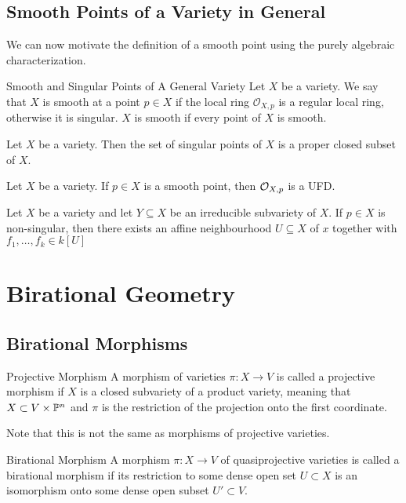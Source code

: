 \documentclass[a4paper]{article}
\begin{document}
\subsection{Smooth Points of a Variety in General}
We can now motivate the definition of a smooth point using the purely algebraic characterization. 

\begin{defn}{Smooth and Singular Points of A General Variety}{} Let $X$ be a variety. We say that $X$ is smooth at a point $p\in X$ if the local ring $\mathcal{O}_{X,p}$ is a regular local ring, otherwise it is singular. $X$ is smooth if every point of $X$ is smooth. 
\end{defn}

\begin{thm}{}{} Let $X$ be a variety. Then the set of singular points of $X$ is a proper closed subset of $X$. 
\end{thm}

\begin{prp}{}{} Let $X$ be a variety. If $p\in X$ is a smooth point, then $\mathcal{O}_{X,p}$ is a UFD. 
\end{prp}

\begin{prp}{}{} Let $X$ be a variety and let $Y\subseteq X$ be an irreducible subvariety of $X$. If $p\in X$ is non-singular, then there exists an affine neighbourhood $U\subseteq X$ of $x$ together with $f_1,\dots,f_k\in k[U]$
\end{prp}

\pagebreak
\section{Birational Geometry}
\subsection{Birational Morphisms}
\begin{defn}{Projective Morphism}{} A morphism of varieties $\pi:X\to V$ is called a projective morphism if $X$ is a closed subvariety of a product variety, meaning that $X\subset V\times\mathbb{P}^n$ and $\pi$ is the restriction of the projection onto the first coordinate. 
\end{defn}

Note that this is not the same as morphisms of projective varieties. 

\begin{defn}{Birational Morphism}{} A morphism $\pi:X\to V$ of quasiprojective varieties is called a birational morphism if its restriction to some dense open set $U\subset X$ is an isomorphism onto some dense open subset $U'\subset V$. 
\end{defn}
\end{document}
